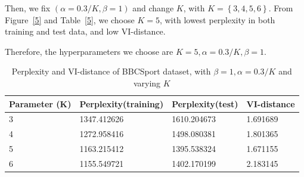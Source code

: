 \documentclass{article} %
\begin{document}
Then, we fix $(\alpha=0.3/K, \beta=1)$ and change $K$, with $K = \left\{3,4,5,6\right\}$. From Figure~\ref{5} and Table~\ref{5}, we choose $K=5$, with lowest perplexity in both training and test data, and low VI-distance.
\par
Therefore, the hyperparameters we choose are $K = 5, \alpha = 0.3/K, \beta = 1$.
\begin{table}
\centering
    \begin{tabular}{|l|l|l|l|}
    \hline
    Parameter (K) & Perplexity(training) & Perplexity(test) & VI-distance \\ \hline
    3             & 1347.412626          & 1610.204673      & 1.691689    \\ \hline
    4             & 1272.958416          & 1498.080381      & 1.801365    \\ \hline
    5             & 1163.215412          & 1395.538324      & 1.671155    \\ \hline
    6             & 1155.549721          & 1402.170199      & 2.183145    \\ \hline
    \end{tabular}
    \caption{Perplexity and VI-distance of BBCSport dataset, with $\beta= 1, \alpha = 0.3/K$ and varying $K$}
\label{table5}
\end{table}
\end{document}
